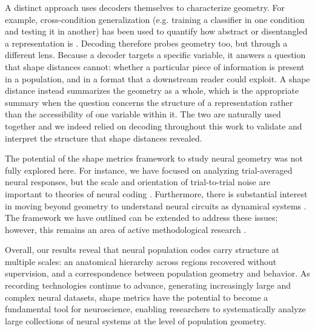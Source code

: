 A distinct approach uses decoders themselves to characterize geometry. For example, cross-condition generalization (e.g. training a classifier in one condition and testing it in another) has been used to quantify how abstract or disentangled a representation is \parencite{bernardi,saez,barbosa2023,courellis2024, fascianelli2024neural,posani2026,nogueira2026}.
Decoding therefore probes geometry too, but through a different lens. Because a decoder targets a specific variable, it answers a question that shape distances cannot: whether a particular piece of information is present in a population, and in a format that a downstream reader could exploit.
A shape distance instead summarizes the geometry as a whole, which is the appropriate summary when the question concerns the structure of a representation rather than the accessibility of one variable within it.
The two are naturally used together and we indeed relied on decoding throughout this work to validate and interpret the structure that shape distances revealed.

The potential of the shape metrics framework to study neural geometry was not fully explored here. For instance, we have focused on analyzing trial-averaged neural responses, but the scale and orientation of trial-to-trial noise are important to theories of neural coding \parencite{moreno2014information,mahuas2025strong}.
Furthermore, there is substantial interest in moving beyond geometry to understand neural circuits as dynamical systems \parencite{vyas2020computation}.
The framework we have outlined can be extended to address these issues; however, this remains an area of active methodological research \parencite{duong2023representational,ostrow2024beyond,nejatbakhsh2024comparing, cayco2026}.

Overall, our results reveal that neural population codes carry structure at multiple scales: an anatomical hierarchy across regions recovered without supervision, and a correspondence between population geometry and behavior.
As recording technologies continue to advance, generating increasingly large and complex neural datasets, shape metrics have the potential to become a fundamental tool for neuroscience, enabling researchers to systematically analyze large collections of neural systems at the level of population geometry.